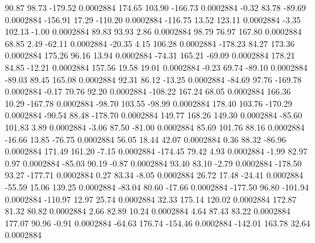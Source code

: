        90.87       98.73     -179.52     0.0002884
      174.65      103.90     -166.73     0.0002884
       -0.32       83.78      -89.69     0.0002884
     -156.91       17.29     -110.20     0.0002884
     -116.75       13.52      123.11     0.0002884
       -3.35      102.13       -1.00     0.0002884
       89.83       93.93        2.86     0.0002884
       98.79       76.97      167.80     0.0002884
       68.85        2.49      -62.11     0.0002884
      -20.35        4.15      106.28     0.0002884
     -178.23       84.27      173.36     0.0002884
      175.26       96.16       13.94     0.0002884
      -74.31      165.21      -69.09     0.0002884
      178.21       84.85      -12.21     0.0002884
      157.56       19.58       19.01     0.0002884
       -0.23       69.74      -89.10     0.0002884
      -89.03       89.45      165.08     0.0002884
       92.31       86.12      -13.25     0.0002884
      -84.69       97.76     -169.78     0.0002884
       -0.17       70.76       92.20     0.0002884
     -108.22      167.24       68.05     0.0002884
      166.36       10.29     -167.78     0.0002884
      -98.70      103.55      -98.99     0.0002884
      178.40      103.76     -170.29     0.0002884
      -90.54       88.48     -178.70     0.0002884
      149.77      168.26      149.30     0.0002884
      -85.60      101.83        3.89     0.0002884
       -3.06       87.50      -81.00     0.0002884
       85.69      101.76       88.16     0.0002884
      -16.66       13.85      -76.75     0.0002884
       56.05       18.44       42.07     0.0002884
        0.36       88.32      -86.96     0.0002884
      171.49      161.20       -7.15     0.0002884
     -174.45       79.42        4.93     0.0002884
       -1.99       82.97        0.97     0.0002884
      -85.03       90.19       -0.87     0.0002884
       93.40       83.10       -2.79     0.0002884
     -178.50       93.27     -177.71     0.0002884
        0.27       83.34       -8.05     0.0002884
       26.72       17.48      -24.41     0.0002884
      -55.59       15.06      139.25     0.0002884
      -83.04       80.60      -17.66     0.0002884
     -177.50       96.80     -101.94     0.0002884
     -110.97       12.97       25.74     0.0002884
       32.33      175.14      120.02     0.0002884
      172.87       81.32       80.82     0.0002884
        2.66       82.89       10.24     0.0002884
        4.64       87.43       83.22     0.0002884
      177.07       90.96       -0.91     0.0002884
      -64.63      176.74     -154.46     0.0002884
     -142.01      163.78       32.64     0.0002884
